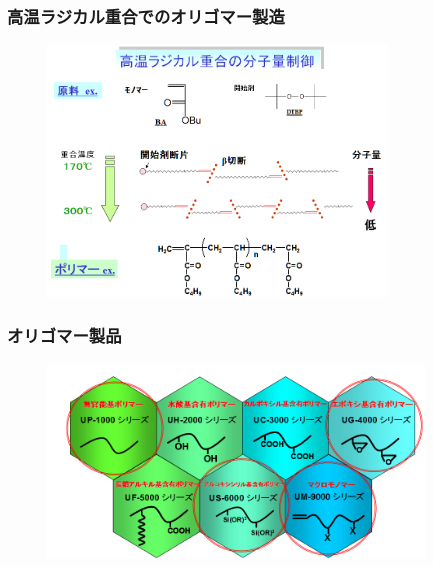 \documentclass[unicode,12pt]{beamer}%
\begin{document}
%
\begin{frame}
	\frametitle{高温ラジカル重合でのオリゴマー製造}
		\begin{figure}[!b]
			\begin{center}
				\includegraphics[width=90mm]{Mw_seigyo.png}
			\end{center}
		\end{figure}
		\end{frame}
		\begin{frame}\frametitle{オリゴマー製品}
		\begin{figure}[!b]
			\begin{center}
				\includegraphics[width=100mm]{seihin.png}
			\end{center}
		\end{figure}
\end{frame}
\end{document}
